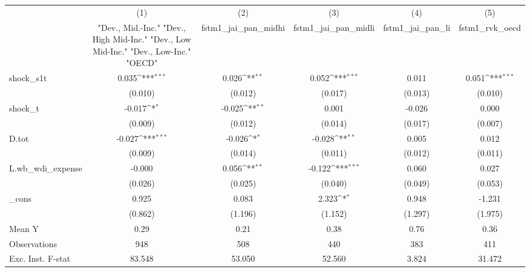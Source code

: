 {
\def\sym#1{\ifmmode^{#1}\else\(^{#1}\)\fi}
\begin{tabular}{l*{5}{c}}
\toprule
            &\multicolumn{1}{c}{(1)}&\multicolumn{1}{c}{(2)}&\multicolumn{1}{c}{(3)}&\multicolumn{1}{c}{(4)}&\multicolumn{1}{c}{(5)}\\
            &\multicolumn{1}{c}{ "Dev., Mid.-Inc." "Dev., High Mid-Inc." "Dev., Low Mid-Inc." "Dev., Low-Inc." "OECD" }&\multicolumn{1}{c}{fstm1\_jai\_pan\_midhi}&\multicolumn{1}{c}{fstm1\_jai\_pan\_midli}&\multicolumn{1}{c}{fstm1\_jai\_pan\_li}&\multicolumn{1}{c}{fstm1\_rvk\_oecd}\\
\midrule
shock\_s1t   &       0.035\sym{***}&       0.026\sym{**} &       0.052\sym{***}&       0.011         &       0.051\sym{***}\\
            &     (0.010)         &     (0.012)         &     (0.017)         &     (0.013)         &     (0.010)         \\
\addlinespace
shock\_t     &      -0.017\sym{*}  &      -0.025\sym{**} &       0.001         &      -0.026         &       0.000         \\
            &     (0.009)         &     (0.012)         &     (0.014)         &     (0.017)         &     (0.007)         \\
\addlinespace
D.tot       &      -0.027\sym{***}&      -0.026\sym{*}  &      -0.028\sym{**} &       0.005         &       0.012         \\
            &     (0.009)         &     (0.014)         &     (0.011)         &     (0.012)         &     (0.011)         \\
\addlinespace
L.wb\_wdi\_expense&      -0.000         &       0.056\sym{**} &      -0.122\sym{***}&       0.060         &       0.027         \\
            &     (0.026)         &     (0.025)         &     (0.040)         &     (0.049)         &     (0.053)         \\
\addlinespace
\_cons      &       0.925         &       0.083         &       2.323\sym{*}  &       0.948         &      -1.231         \\
            &     (0.862)         &     (1.196)         &     (1.152)         &     (1.297)         &     (1.975)         \\
\midrule
Mean Y      &        0.29         &        0.21         &        0.38         &        0.76         &        0.36         \\
Observations&         948         &         508         &         440         &         383         &         411         \\
Exc. Inst. F-stat&      83.548         &      53.050         &      52.560         &       3.824         &      31.472         \\
\bottomrule
\end{tabular}
}
